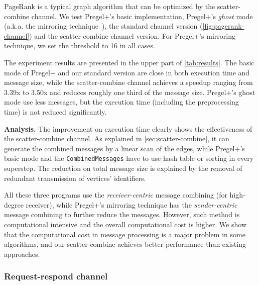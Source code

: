 \documentclass{sokendai_thesis} %
\newcommand{\PP}{Pregel+}
\begin{document}

PageRank is a typical graph algorithm that can be optimized by the scatter-combine channel.
We test \PP{}'s basic implementation, \PP{}'s \textit{ghost} mode (a.k.a. the mirroring technique~\cite{yan2015effective}), the standard channel version (\autoref{fig:pagerank-channel}) and the scatter-combine channel version.
For \PP{}'s mirroring technique, we set the threshold to 16 in all cases.

The experiment results are presented in the upper part of \autoref{tab:results}.
The basic mode of \PP{} and our standard version are close in both execution time and message size, while the scatter-combine channel achieves a speedup ranging from 3.39x to 3.50x and reduces roughly one third of the message size.
\PP{}'s ghost mode use less messages, but the execution time (including the preprocessing time) is not reduced significantly.

\textbf{Analysis.}
The improvement on execution time clearly shows the effectiveness of the scatter-combine channel.
As explained in \autoref{sec:scatter-combine}, it can generate the combined messages by a linear scan of the edges, while \PP{}'s basic mode and the \texttt{CombinedMessages} have to use hash table or sorting in every superstep.
The reduction on total message size is explained by the removal of redundant transmission of vertices' identifiers.

All these three programs use the \textit{receiver-centric} message combining (for high-degree receiver), while \PP{}'s mirroring technique has the \textit{sender-centric} message combining to further reduce the messages.
However, such method is computational intensive and the overall computational cost is higher.
We show that the computational cost in message processing is a major problem in some algorithms, and our scatter-combine achieves better performance than existing approaches.

\subsubsection{Request-respond channel}
\label{sec:eval-rr}
\end{document}
